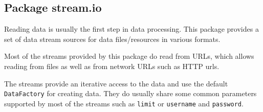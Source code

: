 \subsection{Package stream.io}

Reading data is usually the first step in data processing. This package
provides a set of data stream sources for data files/resources in
various formats.

Most of the streams provided by this package do read from URLs, which
allows reading from files as well as from network URLs such as HTTP
urls.

The streams provide an iterative access to the data and use the default
\texttt{DataFactory} for creating data. They do usually share some
common parameters supported by most of the streams such as
\texttt{limit} or \texttt{username} and \texttt{password}.



















